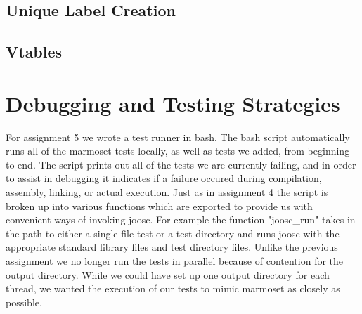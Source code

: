 \documentclass[12pt,letterpaper]{article}
\begin{document}
\subsection{Unique Label Creation}

\subsection{Vtables}

\section{Debugging and Testing Strategies}
For assignment 5 we wrote a test runner in bash.
The bash script automatically runs all of the marmoset tests locally, as well as tests we added, from beginning to end.
The script prints out all of the tests we are currently failing, and in order to assist in debugging it indicates if a failure occured during compilation, assembly, linking, or actual execution.
Just as in assignment 4 the script is broken up into various functions which are exported to provide us with convenient ways of invoking joosc.
For example the function "joosc\_run" takes in the path to either a single file test or a test directory and runs joosc with the appropriate standard library files and test directory files.
Unlike the previous assignment we no longer run the tests in parallel because of contention for the output directory.
While we could have set up one output directory for each thread, we wanted the execution of our tests to mimic marmoset as closely as possible.
\end{document}
